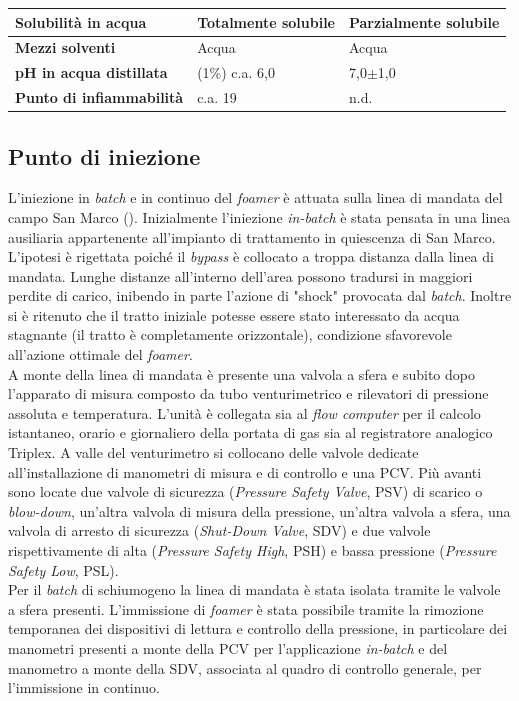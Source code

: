 \begin{table}[htbp]
\begin{tabular}{|p{}|p{}p{}|}
\textbf{Solubilità in acqua}  & Totalmente solubile                           & Parzialmente solubile                         \\\hline
\textbf{Mezzi solventi  }               & Acqua                                         & Acqua                                         \\\hline
\textbf{pH in acqua distillata }        & (1\%) c.a. 6,0                                & 7,0\(\pm\)1,0                                     \\\hline
\textbf{Punto di infiammabilità   }     & c.a. 19                                       & n.d.                                         \\
\hline
\end{tabular}
\end{table}


\subsection{Punto di iniezione}
L'iniezione in \textit{batch} e in continuo del \textit{foamer} è attuata sulla linea di mandata del campo San Marco (). Inizialmente l'iniezione \textit{in-batch} è stata pensata in una linea ausiliaria appartenente all'impianto di trattamento in quiescenza di San Marco. L'ipotesi è rigettata poiché il \textit{bypass} è collocato a troppa distanza dalla linea di mandata. Lunghe distanze all'interno dell'area possono tradursi in maggiori perdite di carico, inibendo in parte l'azione di "shock" provocata dal \textit{batch}. Inoltre si è ritenuto che il tratto iniziale potesse essere stato interessato da acqua stagnante (il tratto è completamente orizzontale), condizione sfavorevole all'azione ottimale del \textit{foamer}.\\
A monte della linea di mandata è presente una valvola a sfera e subito dopo l'apparato di misura composto da tubo venturimetrico e rilevatori di pressione assoluta e temperatura. L'unità è collegata sia al \textit{flow computer} per il calcolo istantaneo, orario e giornaliero della portata di gas sia al registratore analogico Triplex. A valle del venturimetro si collocano delle valvole dedicate all'installazione di manometri di misura e di controllo e una PCV. Più avanti sono locate due valvole di sicurezza (\textit{Pressure Safety Valve}, PSV) di scarico o \textit{blow-down}, un'altra valvola di misura della pressione, un'altra valvola a sfera, una valvola di arresto di sicurezza (\textit{Shut-Down Valve}, SDV) e due valvole rispettivamente di alta (\textit{Pressure Safety High}, PSH) e bassa pressione (\textit{Pressure Safety Low}, PSL).\\
Per il \textit{batch} di schiumogeno la linea di mandata è stata isolata tramite le valvole a sfera presenti. L'immissione di \textit{foamer} è stata possibile tramite la rimozione temporanea dei dispositivi di lettura e controllo della pressione, in particolare dei manometri presenti a monte della PCV per l'applicazione \textit{in-batch} e del manometro a monte della SDV, associata al quadro di controllo generale, per l'immissione in continuo.

